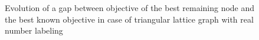 \begin{figure}[h]
\caption{Evolution of a gap between objective of the best remaining node and the best known objective in case of triangular lattice graph with real number labeling}
\label{fig:3}
\end{figure} 
